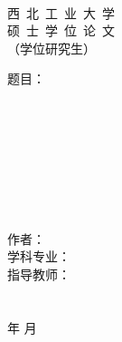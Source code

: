 \begin{titlepage}
	\sSanhao ~
	\begin{spacing}{1.5}
		\begin{center}
			\begin{center}
				\sSanhao 西~北~工~业~大~学 \\
				\sYihao 硕~士~学~位~论~文 \\
				\sSihao （学位研究生）\\
			\end{center}
			\vskip 5cm
			\fSong \sErhao \hspace{1em} 题目：\hspace{0.2cm} \\
			\hspace{1em} \phantom{大空格}\hspace{0.2cm} \\
			\fSong \sWuhao ~ \\
			\fSong \sWuhao ~ \\
			\fSong \sWuhao ~ \\
			\fSong \sWuhao ~ \\
			\fSong \sWuhao ~ \\
			\fSong \sWuhao ~ \\
			\fSong \sWuhao ~ \\
			\sSanhao 作\phantom{空格}者：\coverunderline[5.5cm]{\authorname} \\
			\sSanhao 学科专业： \\
			\sSanhao 指导教师： \\
			\fSong \sWuhao ~ \\
			\fSong \sWuhao ~ \\
			\fSong \sSanhao {}\fSong 年 \fSong 月
		\end{center}
	\end{spacing}
\end{titlepage}

\fSong \normalsize

\endinput